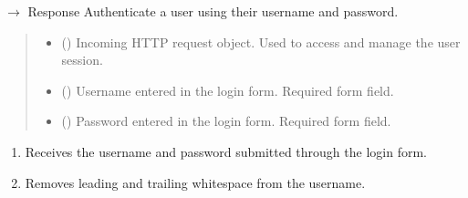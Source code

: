 \documentclass[letterpaper,10pt,english]{sphinxmanual}
\begin{document}
\begin{fulllineitems}
\label{\detokenize{modules:app.auth.login}}
\pysigstartsignatures
\pysiglinewithargsret
{}
{\sphinxparamcomma {}\sphinxparamcomma {}}
{{ $\rightarrow$ Response}}
\pysigstopsignatures
\sphinxAtStartPar
Authenticate a user using their username and password.
\begin{quote}\begin{description}
\begin{itemize}
\item {} 
\sphinxAtStartPar
{} () \textendash{} Incoming HTTP request object.
Used to access and manage the user session.

\item {} 
\sphinxAtStartPar
{} () \textendash{} Username entered in the login form.
Required form field.

\item {} 
\sphinxAtStartPar
{} () \textendash{} Password entered in the login form.
Required form field.

\end{itemize}

\end{description}\end{quote}
\begin{description}
\begin{enumerate}
%
\item {} 
\sphinxAtStartPar
Receives the username and password submitted through
the login form.

\item {} 
\sphinxAtStartPar
Removes leading and trailing whitespace from the username.


\end{enumerate}
\end{description}
\end{fulllineitems}
\end{document}
